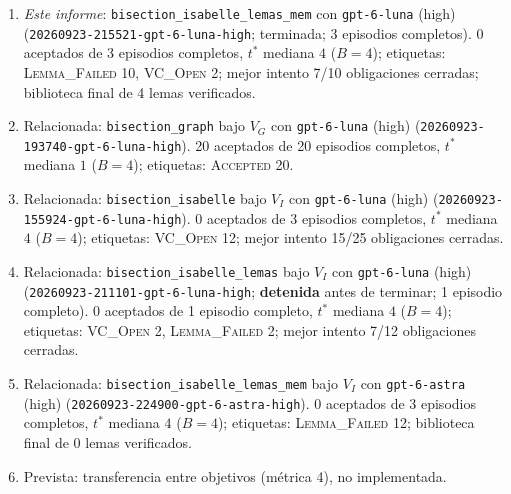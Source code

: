 \documentclass[11pt,a4paper]{article}
\begin{document}
{\raggedright
\begin{enumerate}
  \item \emph{Este informe}: \texttt{bisection\_\allowbreak{}isabelle\_\allowbreak{}lemas\_\allowbreak{}mem} con \texttt{gpt-\allowbreak{}6-\allowbreak{}luna} (high) (\texttt{20260923-\allowbreak{}215521-\allowbreak{}gpt-\allowbreak{}6-\allowbreak{}luna-\allowbreak{}high}; terminada; 3 episodios completos). 0 aceptados de 3 episodios completos, $t^*$ mediana $4$ ($B = 4$); etiquetas: \textsc{Lemma\_Failed} 10, \textsc{VC\_Open} 2; mejor intento 7/10 obligaciones cerradas; biblioteca final de 4 lemas verificados.
  \item Relacionada: \texttt{bisection\_\allowbreak{}graph} bajo $V_G$ con \texttt{gpt-\allowbreak{}6-\allowbreak{}luna} (high) (\texttt{20260923-\allowbreak{}193740-\allowbreak{}gpt-\allowbreak{}6-\allowbreak{}luna-\allowbreak{}high}). 20 aceptados de 20 episodios completos, $t^*$ mediana $1$ ($B = 4$); etiquetas: \textsc{Accepted} 20.
  \item Relacionada: \texttt{bisection\_\allowbreak{}isabelle} bajo $V_I$ con \texttt{gpt-\allowbreak{}6-\allowbreak{}luna} (high) (\texttt{20260923-\allowbreak{}155924-\allowbreak{}gpt-\allowbreak{}6-\allowbreak{}luna-\allowbreak{}high}). 0 aceptados de 3 episodios completos, $t^*$ mediana $4$ ($B = 4$); etiquetas: \textsc{VC\_Open} 12; mejor intento 15/25 obligaciones cerradas.
  \item Relacionada: \texttt{bisection\_\allowbreak{}isabelle\_\allowbreak{}lemas} bajo $V_I$ con \texttt{gpt-\allowbreak{}6-\allowbreak{}luna} (high) (\texttt{20260923-\allowbreak{}211101-\allowbreak{}gpt-\allowbreak{}6-\allowbreak{}luna-\allowbreak{}high}; \textbf{detenida} antes de terminar; 1 episodio completo). 0 aceptados de 1 episodio completo, $t^*$ mediana $4$ ($B = 4$); etiquetas: \textsc{VC\_Open} 2, \textsc{Lemma\_Failed} 2; mejor intento 7/12 obligaciones cerradas.
  \item Relacionada: \texttt{bisection\_\allowbreak{}isabelle\_\allowbreak{}lemas\_\allowbreak{}mem} bajo $V_I$ con \texttt{gpt-\allowbreak{}6-\allowbreak{}astra} (high) (\texttt{20260923-\allowbreak{}224900-\allowbreak{}gpt-\allowbreak{}6-\allowbreak{}astra-\allowbreak{}high}). 0 aceptados de 3 episodios completos, $t^*$ mediana $4$ ($B = 4$); etiquetas: \textsc{Lemma\_Failed} 12; biblioteca final de 0 lemas verificados.
  \item Prevista: transferencia entre objetivos (métrica 4), no implementada.
\end{enumerate}
\par}
\end{document}
